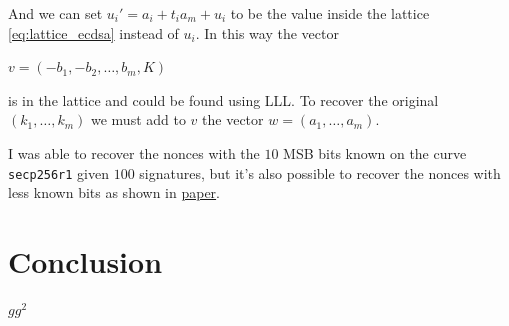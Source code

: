 \documentclass[a4paper,12pt]{report}
\begin{document}
And we can set $u_i' = a_i + t_ia_m + u_i$ to be the value inside the lattice \ref{eq:lattice_ecdsa} instead of $u_i$. In this way the vector

\begin{center}
    $v = (-b_1, -b_2, \ldots, b_m, K)$
\end{center}

is in the lattice and could be found using LLL. To recover the original $(k_1, \ldots, k_m)$ we must add to $v$ the vector $w = (a_1, \ldots, a_m)$.

I was able to recover the nonces with the $10$ MSB bits known on the curve \texttt{secp256r1} given $100$ signatures, but it's also possible
to recover the nonces with less known bits as shown in \href{https://eprint.iacr.org/2020/1540}{paper}.

\chapter*{Conclusion}

$gg^2$



\end{document}
